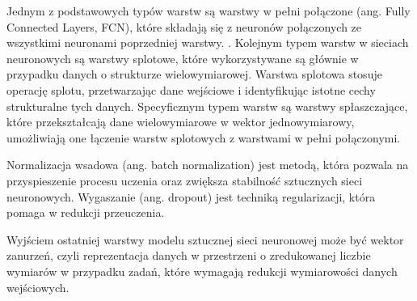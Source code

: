         Jednym z podstawowych typów warstw są warstwy w pełni połączone (ang. Fully Connected Layers, FCN), które składają się z neuronów połączonych ze wszystkimi neuronami poprzedniej warstwy. \cite{Leksykon}. Kolejnym typem warstw w sieciach neuronowych są warstwy splotowe, które wykorzystywane są głównie w przypadku danych o strukturze wielowymiarowej. Warstwa splotowa stosuje operację splotu, przetwarzając dane wejściowe i identyfikując istotne cechy strukturalne tych danych\cite{LeCun:2015}. Specyficznym typem warstw są warstwy spłaszczające, które przekształcają dane wielowymiarowe w wektor jednowymiarowy, umożliwiają one łączenie warstw splotowych z warstwami w pełni połączonymi.

        Normalizacja wsadowa (ang. batch normalization) jest metodą, która pozwala na przyspieszenie procesu uczenia oraz zwiększa stabilność sztucznych sieci neuronowych\cite{Ioffe:2015}. Wygaszanie (ang. dropout)\cite{Wan:2013} jest techniką regularizacji, która pomaga w redukcji przeuczenia\cite{Leksykon}.

        Wyjściem ostatniej warstwy modelu sztucznej sieci neuronowej może być wektor zanurzeń, czyli reprezentacja danych w przestrzeni o zredukowanej liczbie wymiarów w przypadku zadań, które wymagają redukcji wymiarowości danych wejściowych.

